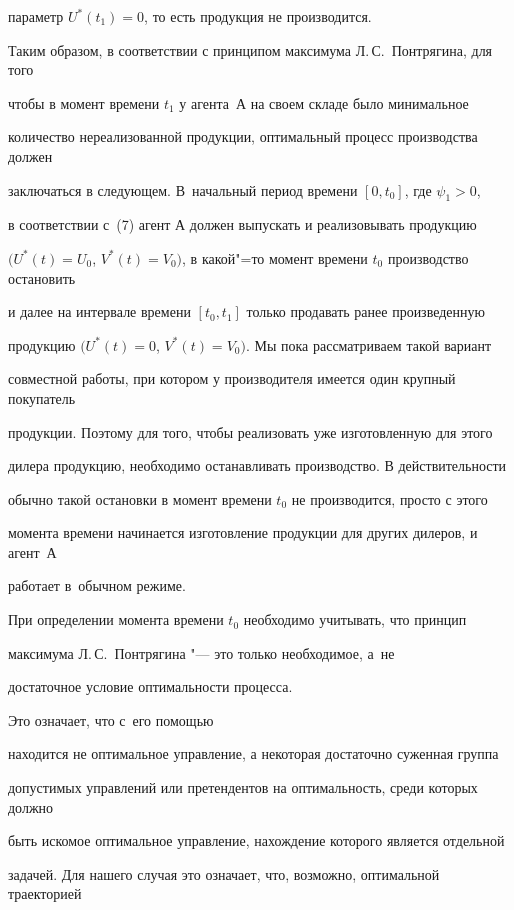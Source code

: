 параметр $U^*(t_1)=0$, то есть продукция не производится.



Таким образом, в соответствии с принципом максимума Л.\,С.~Понтрягина, для того

чтобы в момент времени $t_1$ у агента~А на своем складе было минимальное

количество нереализованной продукции, оптимальный процесс производства должен

заключаться в следующем. В~начальный период времени $[0,t_0]$, где $\psi_1>0$,

в соответствии с~(7) агент А должен выпускать и реализовывать продукцию

$(U^*(t)=U_0$, $V^*(t)=V_0)$, в какой"=то момент времени $t_0$ производство остановить

и далее на интервале времени $[t_0, t_1]$ только продавать ранее произведенную

продукцию $(U^*(t)=0$, $V^*(t)=V_0)$. Мы пока рассматриваем такой вариант

совместной работы, при котором у производителя имеется один крупный покупатель

продукции. Поэтому для того, чтобы реализовать уже изготовленную для этого

дилера продукцию, необходимо останавливать производство. В действительности

обычно такой остановки в момент времени $t_0$ не производится, просто с этого

момента  времени начинается изготовление продукции  для других дилеров, и агент~А

работает в~обычном режиме.



При определении момента времени $t_0$ необходимо учитывать, что принцип

максимума Л.\,С.~Понтрягина "--- это только необходимое, а~не

достаточное условие оптимальности процесса.

Это означает, что с~его помощью

находится не оптимальное управление, а некоторая достаточно суженная группа

допустимых управлений или претендентов на оптимальность, среди которых должно

быть искомое оптимальное управление, нахождение которого является отдельной

задачей. Для нашего случая это означает, что, возможно, оптимальной траекторией

